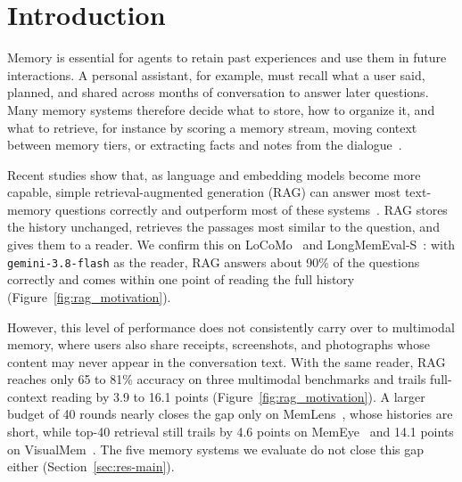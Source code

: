 \section{Introduction}
\label{sec:intro}

Memory is essential for agents to retain past experiences and use them in future interactions. A personal assistant, for example, must recall what a user said, planned, and shared across months of conversation to answer later questions. Many memory systems therefore decide what to store, how to organize it, and what to retrieve, for instance by scoring a memory stream, moving context between memory tiers, or extracting facts and notes from the dialogue~\citep{park2023generative,packer2023memgpt,chhikara2025mem0,xu2025amem,wang2025mirix}.

Recent studies show that, as language and embedding models become more capable, simple retrieval-augmented generation (RAG) can answer most text-memory questions correctly and outperform most of these systems~\citep{bao2026rawrag,zhou2026explicit,sharma2026selection,peng2026memorytax}. RAG stores the history unchanged, retrieves the passages most similar to the question, and gives them to a reader. We confirm this on LoCoMo~\citep{maharana2024locomo} and LongMemEval-S~\citep{wu2025longmemeval}: with \texttt{gemini-3.8-flash} as the reader, RAG answers about 90\% of the questions correctly and comes within one point of reading the full history (Figure~\ref{fig:rag_motivation}).

However, this level of performance does not consistently carry over to multimodal memory, where users also share receipts, screenshots, and photographs whose content may never appear in the conversation text. With the same reader, RAG reaches only 65 to 81\% accuracy on three multimodal benchmarks and trails full-context reading by 3.9 to 16.1 points (Figure~\ref{fig:rag_motivation}). A larger budget of 40 rounds nearly closes the gap only on MemLens~\citep{ren2026memlens}, whose histories are short, while top-40 retrieval still trails by 4.6 points on MemEye~\citep{guo2026memeye} and 14.1 points on VisualMem~\citep{nguyen2026personalvisual}. The five memory systems we evaluate do not close this gap either (Section~\ref{sec:res-main}).

